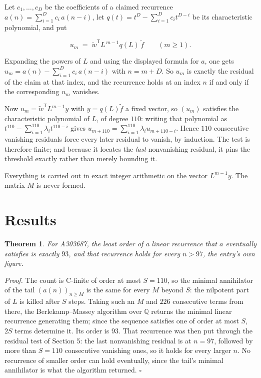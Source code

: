 \documentclass[11pt]{article}
\newtheorem{theorem}{Theorem}
\theoremstyle{definition}
\begin{document}
Let $c_1,\dots,c_D$ be the coefficients of a claimed recurrence $a(n) = \sum_{i=1}^{D} c_i\,a(n-i)$, let $q(t) = t^{D} - \sum_{i=1}^{D} c_i t^{D-i}$ be its characteristic polynomial, and put

\[u_m \;=\; \tilde w^{\mathsf T} L^{\,m-1} q(L)\,\tilde f \qquad (m \ge 1).\]

Expanding the powers of $L$ and using the displayed formula for $a$, one gets $u_m = a(n) - \sum_{i=1}^{D} c_i\,a(n-i)$ with $n = m + D$. So $u_m$ is exactly the residual of the claim at that index, and the recurrence holds at an index $n$ if and only if the corresponding $u_m$ vanishes.

Now $u_m = \tilde w^{\mathsf T} L^{m-1} y$ with $y = q(L)\tilde f$ a fixed vector, so $(u_m)$ satisfies the characteristic polynomial of $L$, of degree $110$: writing that polynomial as $t^{110} - \sum_{i=1}^{110} \lambda_i t^{110-i}$ gives $u_{m+110} = \sum_{i=1}^{110} \lambda_i u_{m+110-i}$. Hence $110$ consecutive vanishing residuals force every later residual to vanish, by induction. The test is therefore finite; and because it locates the {\itshape last} nonvanishing residual, it pins the threshold exactly rather than merely bounding it.

Everything is carried out in exact integer arithmetic on the vector $L^{m-1}y$. The matrix $M$ is never formed.

\section{Results}

\begin{theorem} For A303687, the least order of a linear recurrence that $a$ eventually satisfies is exactly $93$, and that recurrence holds for every $n > 97$, the entry's own figure.\end{theorem}

{\itshape Proof.} The count is C-finite of order at most $S = 110$, so the minimal annihilator of the tail $(a(n))_{n \ge M}$ is the same for every $M$ beyond $S$: the nilpotent part of $L$ is killed after $S$ steps. Taking such an $M$ and $226$ consecutive terms from there, the Berlekamp--Massey algorithm over $\mathbb{Q}$ returns the minimal linear recurrence generating them; since the sequence satisfies one of order at most $S$, $2S$ terms determine it. Its order is $93$. That recurrence was then put through the residual test of Section 5: the last nonvanishing residual is at $n = 97$, followed by more than $S = 110$ consecutive vanishing ones, so it holds for every larger $n$. No recurrence of smaller order can hold eventually, since the tail's minimal annihilator is what the algorithm returned. $\square$
\end{document}
